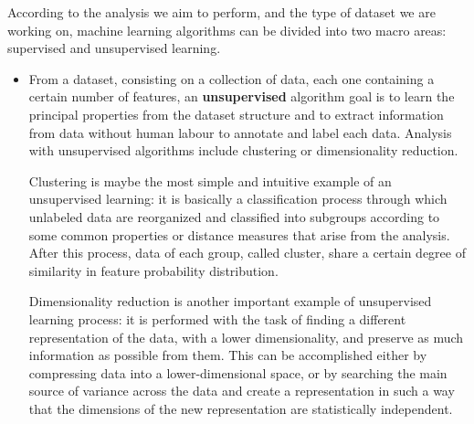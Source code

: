 \documentclass[11pt]{report}
\begin{document}
According to the analysis we aim to perform, and the type of dataset we are working on, machine learning algorithms can be divided into two macro areas: supervised and unsupervised learning.
\begin{itemize}
\item From a dataset, consisting on a collection of data, each one containing a certain number of features, an \textbf{unsupervised} algorithm goal is to learn the principal properties from the dataset structure and to extract information from data without human labour to annotate and label each data.
Analysis with unsupervised algorithms include clustering or dimensionality reduction.

Clustering is maybe the most simple and intuitive example of an unsupervised learning: it is basically a classification process through which unlabeled data are reorganized and classified into subgroups according to some common properties or distance measures that arise from the analysis.
After this process, data of each group, called cluster, share a certain degree of similarity in feature probability distribution.


Dimensionality reduction is another important example of unsupervised learning process: it is performed with the task of finding a different representation of the data, with a lower dimensionality, and preserve as much information as possible from them.
This can be accomplished either by compressing data into a lower-dimensional space, or by searching the main source of variance across the data and create a representation in such a way that the dimensions of the new representation are statistically independent.





\end{itemize}
\end{document}
